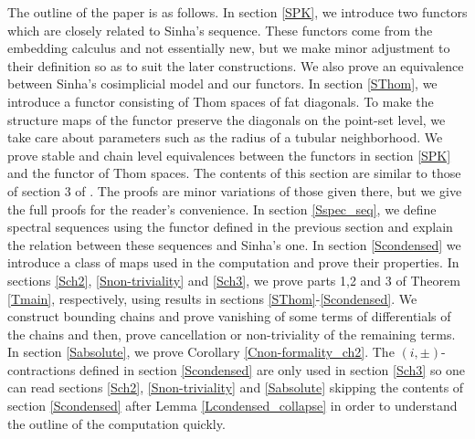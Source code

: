 \documentclass[reqno]{amsart}
\theoremstyle{definition}
\theoremstyle{plain}
\begin{document}
\indent The outline of the paper is as follows. In section \ref{SPK}, we introduce two functors which are closely related to Sinha's sequence. These functors come from the embedding calculus and not essentially new, but we make minor adjustment to their definition so as to suit the later constructions. We also prove an equivalence between Sinha's cosimplicial model and our functors. In section \ref{SThom}, we introduce a functor consisting of Thom spaces of  fat diagonals. To make the structure maps of the functor preserve the diagonals on the point-set level, we take care about parameters such as the radius  of a tubular neighborhood. We prove stable and chain level equivalences between the functors in section \ref{SPK} and the functor of Thom spaces. The contents of this section are similar to those of section 3 of \cite{moriya1}. The proofs are minor variations of those given there, but we give the full proofs for the reader's convenience. In section \ref{Sspec_seq}, we define spectral sequences using the functor defined in the previous section and explain the relation between these sequences and Sinha's one. In section \ref{Scondensed} we introduce a class of maps used in the computation and prove their properties. In sections \ref{Sch2}, \ref{Snon-triviality} and \ref{Sch3}, we prove parts 1,2 and 3 of Theorem \ref{Tmain}, respectively, using results in sections \ref{SThom}-\ref{Scondensed}. We construct bounding chains and prove vanishing of some  terms of differentials of the chains and then, prove cancellation or non-triviality of the remaining terms.  In section \ref{Sabsolute}, we prove Corollary \ref{Cnon-formality_ch2}.  The $(i,\pm)$-contractions defined in section \ref{Scondensed} are only used in section \ref{Sch3} so one can read sections \ref{Sch2}, \ref{Snon-triviality} and \ref{Sabsolute} skipping the contents of section \ref{Scondensed} after Lemma \ref{Lcondensed_collapse} in order to understand the outline of the computation quickly. 
\end{document}
